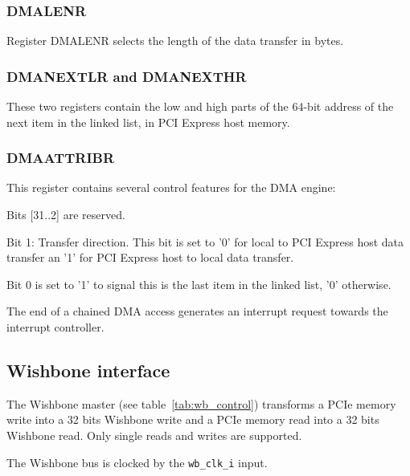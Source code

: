 \documentclass[10pt,a4paper]{cerndoc}
\begin{document}
\subsubsection{DMALENR}
Register DMALENR selects the length of the data transfer in bytes. 

\subsubsection{DMANEXTLR and DMANEXTHR}
These two registers contain the low and high parts of the 64-bit address of the next item in the linked list, in PCI Express host memory.

\subsubsection{DMAATTRIBR}
This register contains several control features for the DMA engine:
\begin{packed_item}
\item Bits [31..2] are reserved.
\item Bit 1: Transfer direction. This bit is set to '0' for local to PCI Express host data transfer an '1' for PCI Express host to local data transfer.
\item Bit 0 is set to '1' to signal this is the last item in the linked list, '0' otherwise.
\end{packed_item}

The end of a chained DMA access generates an interrupt request towards the interrupt controller.    
    \subsection{Wishbone interface}
    The Wishbone master (see table~\ref{tab:wb_control}) transforms a PCIe memory write into a 32 bits Wishbone write and a PCIe memory read into a 32 bits Wishbone read. Only single reads and writes are supported.   
    
    The Wishbone bus is clocked by the \verb+wb_clk_i+ input.
    
    
\end{document}
